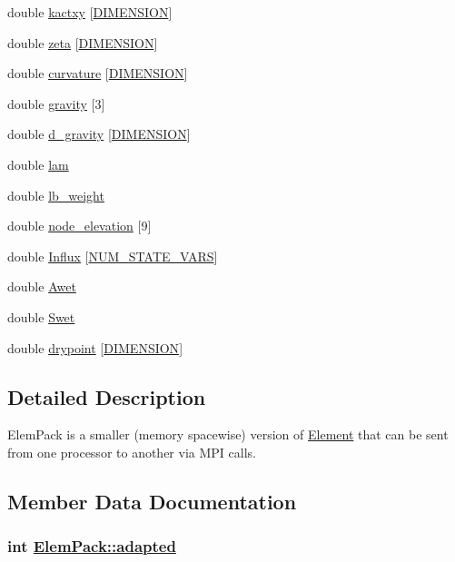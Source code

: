 \begin{CompactItemize}
\item 
double \hyperlink{structElemPack_o36}{kactxy} \mbox{[}\hyperlink{constant_8h_a15}{DIMENSION}\mbox{]}
\item 
double \hyperlink{structElemPack_o37}{zeta} \mbox{[}\hyperlink{constant_8h_a15}{DIMENSION}\mbox{]}
\item 
double \hyperlink{structElemPack_o38}{curvature} \mbox{[}\hyperlink{constant_8h_a15}{DIMENSION}\mbox{]}
\item 
double \hyperlink{structElemPack_o39}{gravity} \mbox{[}3\mbox{]}
\item 
double \hyperlink{structElemPack_o40}{d\_\-gravity} \mbox{[}\hyperlink{constant_8h_a15}{DIMENSION}\mbox{]}
\item 
double \hyperlink{structElemPack_o41}{lam}
\item 
double \hyperlink{structElemPack_o42}{lb\_\-weight}
\item 
double \hyperlink{structElemPack_o43}{node\_\-elevation} \mbox{[}9\mbox{]}
\item 
double \hyperlink{structElemPack_o44}{Influx} \mbox{[}\hyperlink{constant_8h_a45}{NUM\_\-STATE\_\-VARS}\mbox{]}
\item 
double \hyperlink{structElemPack_o45}{Awet}
\item 
double \hyperlink{structElemPack_o46}{Swet}
\item 
double \hyperlink{structElemPack_o47}{drypoint} \mbox{[}\hyperlink{constant_8h_a15}{DIMENSION}\mbox{]}
\end{CompactItemize}


\subsection{Detailed Description}
Elem\-Pack is a smaller (memory spacewise) version of \hyperlink{classElement}{Element} that can be sent from one processor to another via MPI calls. 



\subsection{Member Data Documentation}
\hypertarget{structElemPack_o9}{
\subsubsection[adapted]{\setlength{\rightskip}{0pt plus 5cm}int \hyperlink{structElemPack_o9}{Elem\-Pack::adapted}}}
\label{structElemPack_o9}


